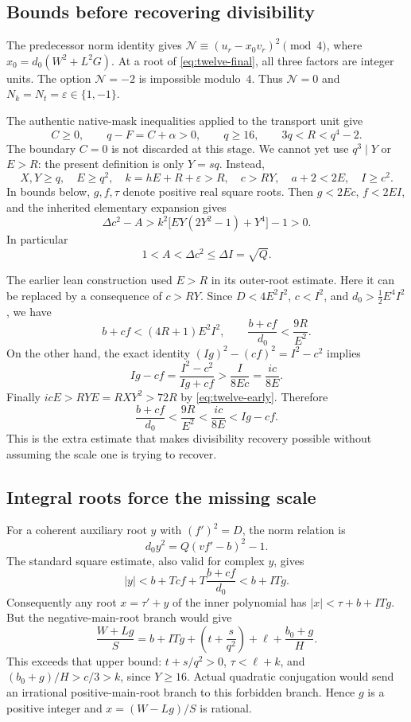 \subsection{Bounds before recovering divisibility}

The predecessor norm identity gives
$\mathcal N\equiv(u_r-x_0v_r)^2\pmod4$, where
$x_0=d_0(W^2+L^2G)$. At a root of \eqref{eq:twelve-final}, all three factors
are integer units. The option $\mathcal N=-2$ is impossible modulo~$4$.
Thus $\mathcal N=0$ and $N_k=N_t=\varepsilon\in\{1,-1\}$.

The authentic native-mask inequalities applied to the transport unit give
\[
 C\ge0,\qquad q-F=C+\alpha>0,\qquad q\ge16,
 \qquad 3q<R<q^4-2.
\]
The boundary $C=0$ is not discarded at this stage. We cannot yet use
$q^3\mid Y$ or $E>R$: the present definition is only $Y=sq$. Instead,
\begin{equation}
 X,Y\ge q,\quad E\ge q^2,\quad
 k=hE+R+\varepsilon>R,\quad c>RY,\quad
 a+2<2E,\quad I\ge c^2.
 \label{eq:twelve-early}
\end{equation}
In bounds below, $g,f,\tau$ denote positive real square roots. Then
$g<2Ec$, $f<2EI$, and the inherited elementary expansion gives
\[
 \Delta c^2-A>
 k^2\bigl[EY(2Y^2-1)+Y^4\bigr]-1>0.
\]
In particular
\begin{equation}
 1<A<\Delta c^2\le\Delta I=\sqrt Q.
 \label{eq:twelve-exception-bound}
\end{equation}

The earlier lean construction used $E>R$ in its outer-root estimate. Here it
can be replaced by a consequence of $c>RY$. Since
$D<4E^2I^2$, $c<I^2$, and $d_0>\tfrac12E^4I^2$, we have
\[
 b+cf<(4R+1)E^2I^2,
 \qquad \frac{b+cf}{d_0}<\frac{9R}{E^2}.
\]
On the other hand, the exact identity
$(Ig)^2-(cf)^2=I^2-c^2$ implies
\[
 Ig-cf=\frac{I^2-c^2}{Ig+cf}>\frac{I}{8Ec}
       =\frac{ic}{8E}.
\]
Finally $icE>RYE=RXY^2>72R$ by \eqref{eq:twelve-early}. Therefore
\begin{equation}
 \frac{b+cf}{d_0}<\frac{9R}{E^2}<\frac{ic}{8E}<Ig-cf.
 \label{eq:twelve-new-bound}
\end{equation}
This is the extra estimate that makes divisibility recovery possible without
assuming the scale one is trying to recover.

\subsection{Integral roots force the missing scale}

For a coherent auxiliary root $y$ with $(f')^2=D$, the norm relation is
\[
 d_0y^2=Q(vf'-b)^2-1.
\]
The standard square estimate, also valid for complex $y$, gives
\[
 |y|<b+Tcf+T\frac{b+cf}{d_0}<b+ITg.
\]
Consequently any root $x=\tau'+y$ of the inner polynomial has
$|x|<\tau+b+ITg$. But the negative-main-root branch would give
\[
 \frac{W+Lg}{S}
 =b+ITg+\left(t+\frac{s}{q^2}\right)
   +\ell+\frac{b_0+g}{H}.
\]
This exceeds that upper bound: $t+s/q^2>0$,
$\tau<\ell+k$, and $(b_0+g)/H>c/3>k$, since $Y\ge16$.
Actual quadratic conjugation would send an irrational positive-main-root
branch to this forbidden branch. Hence $g$ is a positive integer and
$x=(W-Lg)/S$ is rational.

